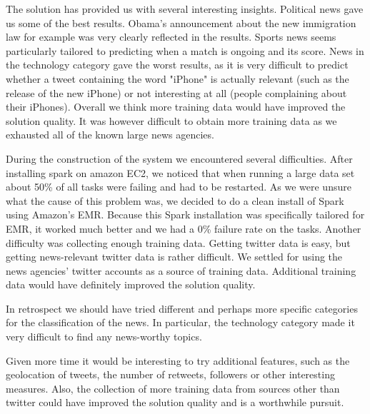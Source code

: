 \documentclass{llncs}
\begin{document}
The solution has provided us with several interesting insights. Political news gave us some of the best results. Obama's announcement about the new immigration law for example was very clearly reflected in the results. Sports news seems particularly tailored to predicting when a match is ongoing and its score. News in the technology category gave the worst results, as it is very difficult to predict whether a tweet containing the word "iPhone" is actually relevant (such as the release of the new iPhone) or not interesting at all (people complaining about their iPhones). Overall we think more training data would have improved the solution quality. It was however difficult to obtain more training data as we exhausted all of the known large news agencies.

During the construction of the system we encountered several difficulties. After installing spark on amazon EC2, we noticed that when running a large data set about 50\% of all tasks were failing and had to be restarted. As we were unsure what the cause of this problem was, we decided to do a clean install of Spark using Amazon's EMR. Because this Spark installation was specifically tailored for EMR, it worked much better and we had a 0\% failure rate on the tasks. Another difficulty was collecting enough training data. Getting twitter data is easy, but getting news-relevant twitter data is rather difficult. We settled for using the news agencies' twitter accounts as a source of training data. Additional training data would have definitely improved the solution quality.

In retrospect we should have tried different and perhaps more specific categories for the classification of the news. In particular, the technology category made it very difficult to find any news-worthy topics.

Given more time it would be interesting to try additional features, such as the geolocation of tweets, the number of retweets, followers or other interesting measures. Also, the collection of more training data from sources other than twitter could have improved the solution quality and is a worthwhile pursuit.



\end{document}
